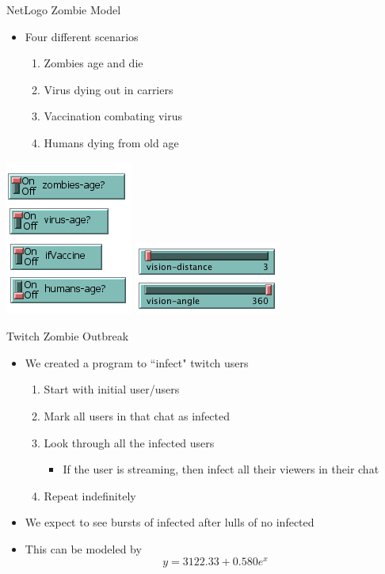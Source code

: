 \documentclass{beamer}
\begin{document}
\begin{frame}{NetLogo Zombie Model}
\begin{itemize}
\item Four different scenarios
\pause
\begin{enumerate}
\item Zombies age and die
\pause
\item Virus dying out in carriers
\pause
\item Vaccination combating virus
\pause
\item Humans dying from old age
\end{enumerate}
\end{itemize}
\begin{center}
\pause
\includegraphics[scale=0.5]{classes}
\hspace{2cm}
\includegraphics[scale=0.5]{grouping}
\end{center}
\end{frame}

\begin{frame}{Twitch Zombie Outbreak}
\begin{itemize}
\item We created a program to ``infect" twitch users
\pause
\begin{enumerate}
\item Start with initial user/users
\pause
\item Mark all users in that chat as infected
\pause
\item Look through all the infected users
\pause
\begin{itemize}
\item If the user is streaming, then infect all their viewers in their chat
\end{itemize}
\pause
\item Repeat indefinitely
\end{enumerate}
\pause
\item We expect to see bursts of infected after lulls of no infected
\pause
\item This can be modeled by
\[
y=3122.33 + 0.580e^{x}
\]
\end{itemize}
\end{frame}
\end{document}
